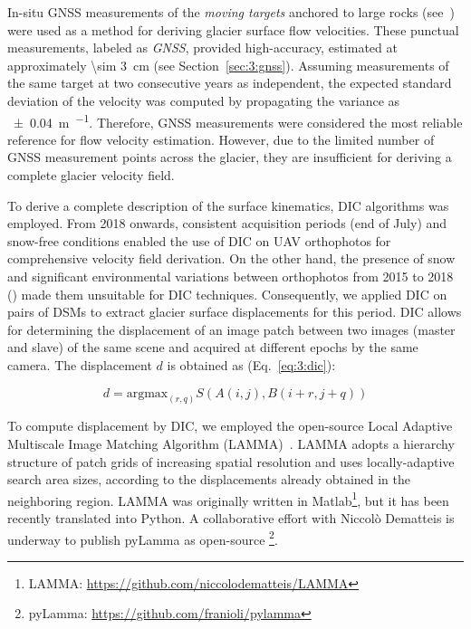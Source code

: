 In-situ GNSS measurements of the \textit{moving targets} anchored to large rocks (see~) were used as a method for deriving glacier surface flow velocities.
These punctual measurements, labeled as \textit{GNSS}, provided high-accuracy, 
estimated at approximately \qty{\sim 3}{\centi\meter} (see Section~\ref{sec:3:gnss}).
Assuming measurements of the same target at two consecutive years as independent, the expected standard deviation 
of the velocity was computed by propagating the variance as \qty{\pm 0.04}{\meter\per\year}.
Therefore, GNSS measurements were considered the most reliable reference for flow velocity estimation.
However, due to the limited number of GNSS measurement points across the glacier, they are insufficient 
for deriving a complete glacier velocity field.

To derive a complete description of the surface kinematics, DIC algorithms was employed. 
From 2018 onwards, consistent acquisition periods (end of July) and snow-free conditions enabled the use of DIC on UAV orthophotos for comprehensive velocity field derivation.
On the other hand, the presence of snow and significant environmental variations between orthophotos from 2015 to 2018
() made them unsuitable for DIC techniques.
Consequently, we applied DIC on pairs of DSMs \citep{Gindraux2019} to extract glacier surface displacements for this period.
DIC allows for determining the displacement of an image patch between two images (master and slave) of the same scene and acquired at different epochs by the same camera. The displacement \(d\) is obtained as  (Eq.~\ref{eq:3:dic}):

\begin{equation}
  d = \text{argmax}_{(r,q)} S(A(i,j),B(i+r,j+q))
  \label{eq:3:dic}
\end{equation}


To compute displacement by DIC, we employed the open-source Local Adaptive Multiscale Image Matching Algorithm (LAMMA)~\citep{Dematteis2022}.
LAMMA adopts a hierarchy structure of patch grids of increasing spatial resolution and uses locally-adaptive search area sizes, according to the displacements already
obtained in the neighboring region.
LAMMA was originally written in Matlab\footnote{LAMMA: \url{https://github.com/niccolodematteis/LAMMA}}, but it has been recently translated into Python.
A collaborative effort with Niccolò Dematteis is underway to publish pyLamma as open-source \footnote{pyLamma: \url{https://github.com/franioli/pylamma}}.

